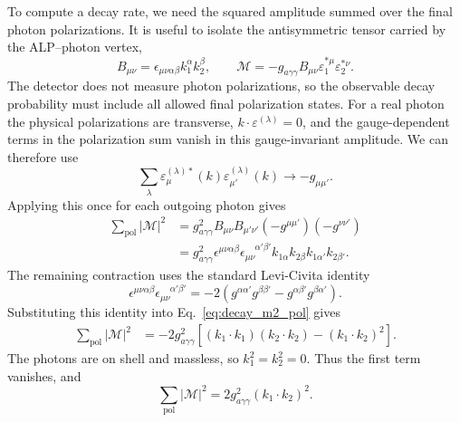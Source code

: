 \documentclass[12pt,a4paper]{article}
\begin{document}
To compute a decay rate, we need the squared amplitude summed over the final
photon polarizations. It is useful to isolate the antisymmetric tensor carried
by the ALP--photon vertex,
\begin{equation}
    B_{\mu\nu}
    =
    \epsilon_{\mu\nu\alpha\beta}
    k_1^\alpha k_2^\beta,
    \qquad
    \mathcal{M}
    =
    -g_{a\gamma\gamma} B_{\mu\nu}
    \varepsilon_1^{*\mu}\varepsilon_2^{*\nu}.
    \label{eq:decay_tensor_form}
\end{equation}
The detector does not measure photon polarizations, so the observable decay
probability must include all allowed final polarization states. For a real
photon the physical polarizations are transverse,
$k\cdot\varepsilon^{(\lambda)}=0$, and the gauge-dependent terms in the
polarization sum vanish in this gauge-invariant amplitude. We can therefore
use
\begin{equation}
    \sum_{\lambda}
    \varepsilon_\mu^{(\lambda)*}(k)
    \varepsilon_{\mu'}^{(\lambda)}(k)
    \longrightarrow
    -g_{\mu\mu'}.
    \label{eq:photon_pol_sum}
\end{equation}
Applying this once for each outgoing photon gives
\begin{align}
    \sum_\mathrm{pol}|\mathcal{M}|^2
    &=
    g_{a\gamma\gamma}^2
    B_{\mu\nu}B_{\mu'\nu'}
    (-g^{\mu\mu'})(-g^{\nu\nu'})
    \nonumber\\
    &=
    g_{a\gamma\gamma}^2
    \epsilon^{\mu\nu\alpha\beta}
    \epsilon_{\mu\nu}^{\phantom{\mu\nu}\alpha'\beta'}
    k_{1\alpha}k_{2\beta}
    k_{1\alpha'}k_{2\beta'}.
    \label{eq:decay_m2_pol}
\end{align}
The remaining contraction uses the standard Levi-Civita identity
\begin{equation}
    \epsilon^{\mu\nu\alpha\beta}
    \epsilon_{\mu\nu}^{\phantom{\mu\nu}\alpha'\beta'}
    =
    -2\left(
      g^{\alpha\alpha'}g^{\beta\beta'}
      -
      g^{\alpha\beta'}g^{\beta\alpha'}
    \right).
    \label{eq:levicivita_contraction}
\end{equation}
Substituting this identity into Eq.~\eqref{eq:decay_m2_pol} gives
\begin{align}
    \sum_\mathrm{pol}|\mathcal{M}|^2
    &=
    -2g_{a\gamma\gamma}^2
    \left[
      (k_1\cdot k_1)(k_2\cdot k_2)
      -
      (k_1\cdot k_2)^2
    \right].
    \label{eq:decay_m2_step}
\end{align}
The photons are on shell and massless, so $k_1^2=k_2^2=0$. Thus the first term
vanishes, and
\begin{equation}
    \sum_\mathrm{pol}|\mathcal{M}|^2
    =
    2g_{a\gamma\gamma}^2(k_1\cdot k_2)^2.
    \label{eq:decay_m2_dot}
\end{equation}
\end{document}
